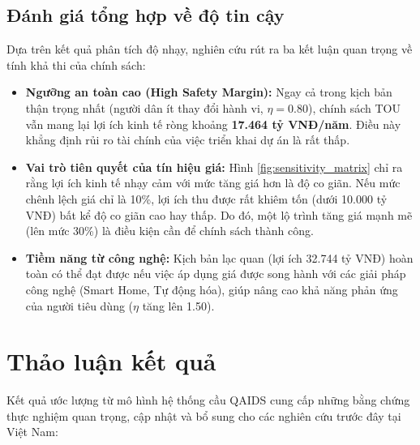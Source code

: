 \documentclass[12pt,a4paper,oneside]{article}
\begin{document}
\subsection*{Đánh giá tổng hợp về độ tin cậy}

Dựa trên kết quả phân tích độ nhạy, nghiên cứu rút ra ba kết luận quan trọng về tính khả thi của chính sách:

\begin{itemize}
	\item \textbf{Ngưỡng an toàn cao (High Safety Margin):} Ngay cả trong kịch bản thận trọng nhất (người dân ít thay đổi hành vi, $\eta=0.80$), chính sách TOU vẫn mang lại lợi ích kinh tế ròng khoảng \textbf{17.464 tỷ VNĐ/năm}. Điều này khẳng định rủi ro tài chính của việc triển khai dự án là rất thấp.
	
	\item \textbf{Vai trò tiên quyết của tín hiệu giá:} Hình \ref{fig:sensitivity_matrix} chỉ ra rằng lợi ích kinh tế nhạy cảm với mức tăng giá hơn là độ co giãn. Nếu mức chênh lệch giá chỉ là 10\%, lợi ích thu được rất khiêm tốn (dưới 10.000 tỷ VNĐ) bất kể độ co giãn cao hay thấp. Do đó, một lộ trình tăng giá mạnh mẽ (lên mức 30\%) là điều kiện cần để chính sách thành công.
	
	\item \textbf{Tiềm năng từ công nghệ:} Kịch bản lạc quan (lợi ích 32.744 tỷ VNĐ) hoàn toàn có thể đạt được nếu việc áp dụng giá được song hành với các giải pháp công nghệ (Smart Home, Tự động hóa), giúp nâng cao khả năng phản ứng của người tiêu dùng ($\eta$ tăng lên 1.50).
\end{itemize}

\section{Thảo luận kết quả}
Kết quả ước lượng từ mô hình hệ thống cầu QAIDS cung cấp những bằng chứng thực nghiệm quan trọng, cập nhật và bổ sung cho các nghiên cứu trước đây tại Việt Nam:
\end{document}
